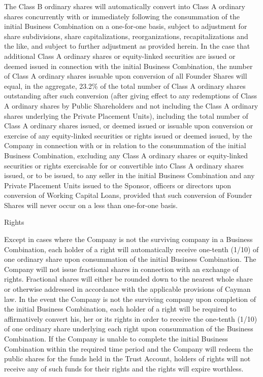 \documentclass[11pt,a4paper]{article}
\begin{document}
The Class B ordinary shares will automatically convert into Class A ordinary shares concurrently with or immediately following the consummation of the initial Business Combination on a one-for-one basis, subject to adjustment for share subdivisions, share capitalizations, reorganizations, recapitalizations and the like, and subject to further adjustment as provided herein. In the case that additional Class A ordinary shares or equity-linked securities are issued or deemed issued in connection with the initial Business Combination, the number of Class A ordinary shares issuable upon conversion of all Founder Shares will equal, in the aggregate, 23.2\% of the total number of Class A ordinary shares outstanding after such conversion (after giving effect to any redemptions of Class A ordinary shares by Public Shareholders and not including the Class A ordinary shares underlying the Private Placement Units), including the total number of Class A ordinary shares issued, or deemed issued or issuable upon conversion or exercise of any equity-linked securities or rights issued or deemed issued, by the Company in connection with or in relation to the consummation of the initial Business Combination, excluding any Class A ordinary shares or equity-linked securities or rights exercisable for or convertible into Class A ordinary shares issued, or to be issued, to any seller in the initial Business Combination and any Private Placement Units issued to the Sponsor, officers or directors upon conversion of Working Capital Loans, provided that such conversion of Founder Shares will never occur on a less than one-for-one basis.

Rights

Except in cases where the Company is not the surviving company in a Business Combination, each holder of a right will automatically receive one-tenth (1/10) of one ordinary share upon consummation of the initial Business Combination. The Company will not issue fractional shares in connection with an exchange of rights. Fractional shares will either be rounded down to the nearest whole share or otherwise addressed in accordance with the applicable provisions of Cayman law. In the event the Company is not the surviving company upon completion of the initial Business Combination, each holder of a right will be required to affirmatively convert his, her or its rights in order to receive the one-tenth (1/10) of one ordinary share underlying each right upon consummation of the Business Combination. If the Company is unable to complete the initial Business Combination within the required time period and the Company will redeem the public shares for the funds held in the Trust Account, holders of rights will not receive any of such funds for their rights and the rights will expire worthless.
\end{document}
